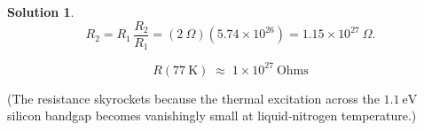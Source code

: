 \documentclass[12pt]{article}
\theoremstyle{definition} %
\newtheorem{solution}{Solution}
\theoremstyle{plain} %
\begin{document}
\begin{solution}
                    \[
                    R_2 = R_1\,\frac{R_2}{R_1}
                         = (2\ \Omega)(5.74\times10^{26})
                         = 1.15\times10^{27}\ \Omega.
                    \]
                    
                    \[
                    \boxed{\;R(77\ \text{K})\;\approx\;1\times10^{27}\ \text{Ohms}\;}
                    \]
                    
                    (The resistance skyrockets because the thermal excitation
                    across the \(1.1\ \text{eV}\) silicon bandgap becomes
                    vanishingly small at liquid‑nitrogen temperature.)
                    \end{solution}
\end{document}
